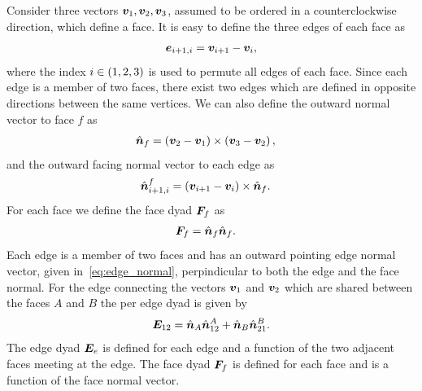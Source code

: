 \documentclass[]{aiaa-tc}%
\begin{document}
Consider three vectors \( \bm{v}_1, \bm{v}_2, \bm{v}_3 \), assumed to be ordered in a counterclockwise direction, which define a face.
It is easy to define the three edges of each face as
\begin{align}\label{eq:edges}
    \bm{e}_{i+1,i} = \bm{v}_{i+1} - \bm{v}_i ,
\end{align}
where the index \( i \in \left( 1,2,3 \right) \) is used to permute all edges of each face.
Since each edge is a member of two faces, there exist two edges which are defined in opposite directions between the same vertices.
We can also define the outward normal vector to face \( f\)  as
\begin{align}\label{eq:face_normal}
    \hat{\bm{n}}_f &= \left( \bm{v}_{2} - \bm{v}_1 \right) \times \left( \bm{v}_{3} - \bm{v}_2 \right) ,
\end{align}
and the outward facing normal vector to each edge as
\begin{align}\label{eq:edge_normal}
    \hat{\bm{n}}_{i+1,i}^f &= \left( \bm{v}_{i+1} - \bm{v}_i \right) \times \hat{\bm{n}}_f .
\end{align}
For each face we define the face dyad \( \bm{F}_f \) as
\begin{align}\label{eq:face_dyad}
    \bm{F}_f &= \hat{\bm{n}}_f \hat{\bm{n}}_f .
\end{align}
Each edge is a member of two faces and has an outward pointing edge normal vector, given in~\cref{eq:edge_normal}, perpindicular to both the edge and the face normal.
For the edge connecting the vectors \( \bm{v}_1 \) and \( \bm{v}_2 \) which are shared between the faces \(A\) and \( B\) the per edge dyad is given by
\begin{align}\label{eq:edge_dyad}
    \bm{E}_{12} = \hat{\bm{n}}_A \hat{\bm{n}}_{12}^A + \hat{\bm{n}}_B \hat{\bm{n}}_{21}^B .
\end{align}
The edge dyad \( \bm{E}_e \) is defined for each edge and a function of the two adjacent faces meeting at the edge.
The face dyad \( \bm{F}_f \) is defined for each face and is a function of the face normal vector.
\end{document}
